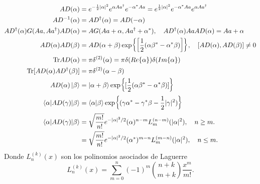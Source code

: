 \begin{align}
  A{D}(\alpha)                                                     & = e^{-\frac{1}{2}|\alpha|^2} e^{\alpha A{a}^\dagger} e^{-\alpha^* A{a}}  = e^{\frac{1}{2}|\alpha|^2} e^{-\alpha^* A{a}} e^{\alpha A{a}^\dagger} \\
  A{D}^{-1}(\alpha)                                                & = A{D}^\dagger (\alpha) = A{D}(-\alpha)                                                                                                               \\
  A{D}^\dagger(\alpha) G(A{a}, A{a}^\dagger) A{D}(\alpha) & = A{G}(A{a} + \alpha, A{a}^\dagger + \alpha^*), \quad A{D}^\dagger(\alpha)A{a}A{D}(\alpha) = A{a}+\alpha                               \\
  A{D}(\alpha)A{D}(\beta)                                       & = A{D}(\alpha + \beta) \exp{\left[ \frac{1}{2}(\alpha\beta^* - \alpha^*\beta) \right]}, \quad [A{D}(\alpha), A{D}(\beta)]\neq 0                    \\
  \mathrm{Tr}A{D}(\alpha)                                          & = \pi \delta^{(2)}(\alpha) = \pi\delta(Re\{\alpha\})\delta(Im\{\alpha\})                                                                                    \\
  \mathrm{Tr}[A{D}(\alpha)A{D}^\dagger(\beta)]                  & = \pi \delta^{(2)}(\alpha-\beta)                                                                                                                            \\
  A{D}(\alpha)\ket{\beta}                                          & = \ket{\alpha + \beta} \exp{[\frac{1}{2}(\alpha\beta^* - \alpha^*\beta)]}                                                                                   \\
  \langle \alpha \vert A{D}(\gamma) \vert \beta\rangle             & = \braket{\alpha}{\beta}\exp{(\gamma\alpha^* - \gamma^*\beta - \frac{1}{2}|\gamma|^2)}                                                                      \\
  \langle \alpha \vert A{D}(\gamma) \vert \beta\rangle             & = \sqrt{\frac{m!}{n!}}e^{-|\alpha|^2/2}(\alpha)^{n-m}L_m^{(n-m)}(|\alpha|^2),\quad n\geq m.                                                                 \\
                                                                      & = \sqrt{\frac{m!}{n!}}e^{-|\alpha|^2/2}(\alpha^*)^{m-n}L_m^{(m-n)}(|\alpha|^2), \quad n\leq m.
\end{align}
Donde $L_n^{(k)}(x)$ son los polinomios asociados de Laguerre
\begin{equation*}
  L_n^{(k)}(x) = \sum_{m=0}^{n} (-1)^m\binom{n+k}{m+k}\frac{x^m}{m!}.
\end{equation*}

